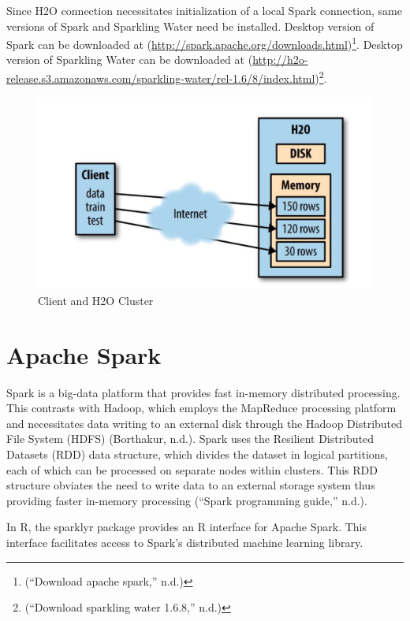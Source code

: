 \documentclass[12pt,twoside]{amherstthesis}
\begin{document}
  Since H2O connection necessitates initialization of a local Spark
  connection, same versions of Spark and Sparkling Water need be
  installed. Desktop version of Spark can be downloaded at
  (\url{http://spark.apache.org/downloads.html})\footnote{(``Download
    apache spark,'' n.d.)}. Desktop version of Sparkling Water can be
  downloaded at
  (\url{http://h2o-release.s3.amazonaws.com/sparkling-water/rel-1.6/8/index.html})\footnote{(``Download
    sparkling water 1.6.8,'' n.d.)}.
  
  \begin{figure}[htbp]
  \centering
  \includegraphics[scale = 0.5,angle = 0]{figure/DataClusters.png}
  \caption[Client and H2O Cluster]{\normalsize{Client and H2O Cluster}}
  \label{fig:HyarnCluster}
  \end{figure}
  
  \section{Apache Spark}\label{apache-spark}
  
  Spark is a big-data platform that provides fast in-memory distributed
  processing. This contrasts with Hadoop, which employs the MapReduce
  processing platform and necessitates data writing to an external disk
  through the Hadoop Distributed File System (HDFS) (Borthakur, n.d.).
  Spark uses the Resilient Distributed Datasets (RDD) data structure,
  which divides the dataset in logical partitions, each of which can be
  processed on separate nodes within clusters. This RDD structure obviates
  the need to write data to an external storage system thus providing
  faster in-memory processing (``Spark programming guide,'' n.d.).
  
  In R, the sparklyr package provides an R interface for Apache Spark.
  This interface facilitates access to Spark's distributed machine
  learning library.
  
\end{document}
